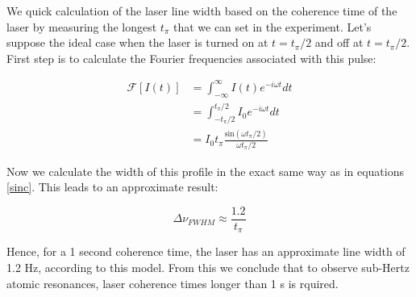 We quick calculation of the laser line width based on the coherence time of the laser by measuring the longest $t_\pi$ that we can set in the experiment. Let's suppose the ideal case when the laser is turned on at $t=t_{\pi}/2$ and off at $t=t_{\pi}/2$. First step is to calculate the Fourier frequencies associated with this pulse:

\begin{equation}
    \begin{split}
        \mathcal{F}[I(t)] & = \int^{\infty}_{-\infty} I(t) e^{-i\omega t} dt \\
        & = \int^{t_{\pi}/2}_{-t_{\pi}/2} I_{0} e^{-i\omega t} dt \\
        & = I_{0} t_{\pi} \frac{\textrm{sin} (\omega t_{\pi}/2)} {\omega t_{\pi}/2}
    \end{split}
\end{equation}

Now we calculate the width of this profile in the exact same way as in equations \ref{sinc}. This leads to an approximate result:

\begin{equation}
    \Delta \nu _{FWHM} \approx \frac{1.2}{t_{\pi}}
\end{equation}

Hence, for a 1 second coherence time, the laser has an approximate line width of 1.2 Hz, according to this model. From this we conclude that to observe sub-Hertz atomic resonances, laser coherence times longer than 1 s is rquired.